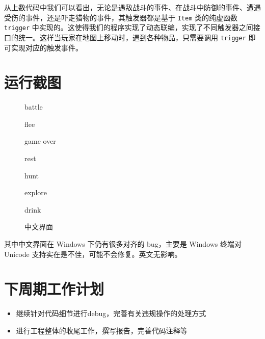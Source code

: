 \documentclass[hyperref,UTF8,a4paper]{ctexart}
\providecommand{\tightlist}{%
  \setlength{\itemsep}{0pt}\setlength{\parskip}{0pt}}
\newcommand{\includegraphicx}[1]{\maxsizebox{\textwidth}{\textheight}{\texttt{[image: \#1]}}}
\begin{document}
从上数代码中我们可以看出，无论是遇敌战斗的事件、在战斗中防御的事件、遭遇受伤的事件，还是吓走猎物的事件，其触发器都是基于
\texttt{Item} 类的纯虚函数 \texttt{trigger}
中实现的。这使得我们的程序实现了动态联编，实现了不同触发器之间接口的统一。这样当玩家在地图上移动时，遇到各种物品，只需要调用
\texttt{trigger} 即可实现对应的触发事件。

\hypertarget{ux8fd0ux884cux622aux56fe}{%
\section{运行截图}\label{ux8fd0ux884cux622aux56fe}}

\begin{figure}[H]
\centering
\includegraphicx{img/battle.png}
\caption{battle}
\end{figure}

\begin{figure}[H]
\centering
\includegraphicx{img/flee.png}
\caption{flee}
\end{figure}

\begin{figure}[H]
\centering
\includegraphicx{img/gameover.png}
\caption{game over}
\end{figure}

\begin{figure}[H]
\centering
\includegraphicx{img/rest.png}
\caption{rest}
\end{figure}

\begin{figure}[H]
\centering
\includegraphicx{img/hunt.png}
\caption{hunt}
\end{figure}

\begin{figure}[H]
\centering
\includegraphicx{img/explore.png}
\caption{explore}
\end{figure}

\begin{figure}[H]
\centering
\includegraphicx{img/drink.png}
\caption{drink}
\end{figure}

\begin{figure}[H]
\centering
\includegraphicx{img/cnnew.png}
\caption{中文界面}
\end{figure}

其中中文界面在 Windows 下仍有很多对齐的 bug，主要是 Windows 终端对
Unicode 支持实在是不佳，可能不会修复。英文无影响。

\hypertarget{ux4e0bux5468ux671fux5de5ux4f5cux8ba1ux5212}{%
\section{下周期工作计划}\label{ux4e0bux5468ux671fux5de5ux4f5cux8ba1ux5212}}

\begin{itemize}
\tightlist
\item
  继续针对代码细节进行debug，完善有关违规操作的处理方式
\item
  进行工程整体的收尾工作，撰写报告，完善代码注释等
\end{itemize}
\end{document}

